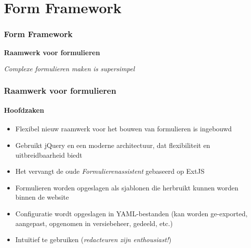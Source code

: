 %

\section{Form Framework}
\begin{frame}[fragile]
	\frametitle{Form Framework}

	\begin{center}\huge{\color{typo3darkgrey}\textbf{Raamwerk voor formulieren}}\end{center}
	\begin{center}\large{\textit{Complexe formulieren maken is supersimpel}}\end{center}

\end{frame}

\begin{frame}[fragile]
	\frametitle{Raamwerk voor formulieren}
	\framesubtitle{Hoofdzaken}

	\begin{itemize}
		\item Flexibel nieuw raamwerk voor het bouwen van formulieren is ingebouwd
		\item Gebruikt jQuery en een moderne architectuur, dat flexibiliteit en uitbreidbaarheid biedt
		\item Het vervangt de oude \textit{Formulierenassistent} gebaseerd op ExtJS
		\item Formulieren worden opgeslagen als sjablonen die herbruikt kunnen worden binnen de website
		\item Configuratie wordt opgeslagen in YAML-bestanden\newline
			\small(kan worden ge-exported, aangepast, opgenomen in versiebeheer, gedeeld, etc.)\normalsize
		\item Intuïtief te gebruiken (\textit{redacteuren zijn enthousiast!})
	\end{itemize}

\end{frame}

